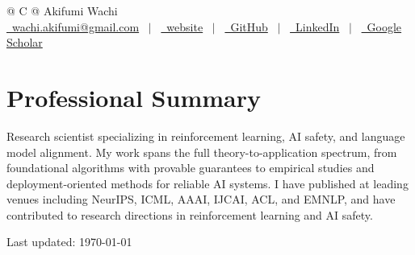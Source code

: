\documentclass[a4paper,11pt]{article}
\begin{document}
\pagestyle{empty} 

\begin{tabularx}{\linewidth}{@{} C @{}}
\Huge{Akifumi Wachi} \\[10pt]
\href{mailto:wachi.akifumi@gmail.com}{\raisebox{-0.05\height}\faEnvelope \ wachi.akifumi@gmail.com} \ $|$ \ 
\href{https://akifumi-wachi-4.github.io/website/}{\raisebox{-0.05\height}\faGlobe \ website} \ $|$ \ 
\href{https://github.com/akifumi-wachi-4}{\raisebox{-0.05\height}\faGithub\ GitHub} \ $|$ \ 
\href{https://www.linkedin.com/in/akifumi-wachi-008654123/}{\raisebox{-0.05\height}\faLinkedin\ LinkedIn} \ $|$ \ 
\href{https://scholar.google.co.jp/citations?user=iC2b9GUAAAAJ}{\raisebox{-0.05\height}\faGraduationCap \ Google Scholar} \\
\end{tabularx}


\section{Professional Summary}
Research scientist specializing in reinforcement learning, AI safety, and language model alignment.
My work spans the full theory-to-application spectrum, from foundational algorithms with provable guarantees to empirical studies and deployment-oriented methods for reliable AI systems.
I have published at leading venues including NeurIPS, ICML, AAAI, IJCAI, ACL, and EMNLP, and have contributed to research directions in reinforcement learning and AI safety.









\vfill
{\centering\footnotesize Last updated: \today\par}
\end{document}
